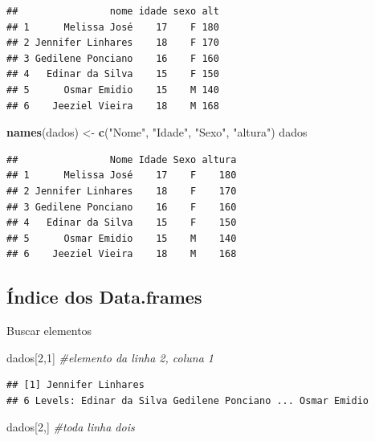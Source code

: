 \documentclass[
]{book}
\newenvironment{Shaded}{\begin{snugshade}}{\end{snugshade}}
\newcommand{\CommentTok}[1]{\textcolor[rgb]{0.56,0.35,0.01}{\textit{#1}}}
\newcommand{\DecValTok}[1]{\textcolor[rgb]{0.00,0.00,0.81}{#1}}
\newcommand{\KeywordTok}[1]{\textcolor[rgb]{0.13,0.29,0.53}{\textbf{#1}}}
\newcommand{\NormalTok}[1]{#1}
\newcommand{\StringTok}[1]{\textcolor[rgb]{0.31,0.60,0.02}{#1}}
\begin{document}
\begin{verbatim}
##                nome idade sexo alt
## 1      Melissa José    17    F 180
## 2 Jennifer Linhares    18    F 170
## 3 Gedilene Ponciano    16    F 160
## 4   Edinar da Silva    15    F 150
## 5      Osmar Emidio    15    M 140
## 6    Jeeziel Vieira    18    M 168
\end{verbatim}

\begin{Shaded}
\begin{Highlighting}[]
\KeywordTok{names}\NormalTok{(dados) <-}\StringTok{ }\KeywordTok{c}\NormalTok{(}\StringTok{"Nome"}\NormalTok{, }\StringTok{"Idade"}\NormalTok{, }\StringTok{"Sexo"}\NormalTok{, }\StringTok{"altura"}\NormalTok{)}
\NormalTok{dados}
\end{Highlighting}
\end{Shaded}

\begin{verbatim}
##                Nome Idade Sexo altura
## 1      Melissa José    17    F    180
## 2 Jennifer Linhares    18    F    170
## 3 Gedilene Ponciano    16    F    160
## 4   Edinar da Silva    15    F    150
## 5      Osmar Emidio    15    M    140
## 6    Jeeziel Vieira    18    M    168
\end{verbatim}

\hypertarget{uxedndice-dos-data.frames}{%
\subsection{Índice dos Data.frames}\label{uxedndice-dos-data.frames}}

Buscar elementos

\begin{Shaded}
\begin{Highlighting}[]
\NormalTok{dados[}\DecValTok{2}\NormalTok{,}\DecValTok{1}\NormalTok{] }\CommentTok{#elemento da  linha  2, coluna 1}
\end{Highlighting}
\end{Shaded}

\begin{verbatim}
## [1] Jennifer Linhares
## 6 Levels: Edinar da Silva Gedilene Ponciano ... Osmar Emidio
\end{verbatim}

\begin{Shaded}
\begin{Highlighting}[]
\NormalTok{dados[}\DecValTok{2}\NormalTok{,] }\CommentTok{#toda linha dois}
\end{Highlighting}
\end{Shaded}
\end{document}
